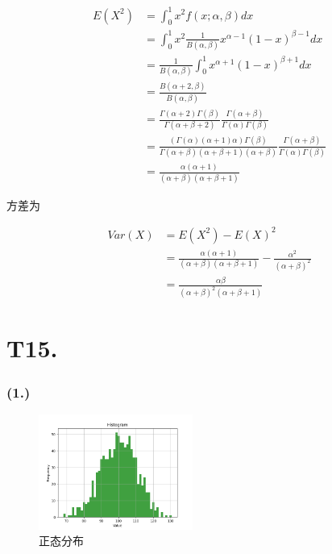 \documentclass{article}
\newcommand\f[2]{\frac{#1}{#2}}
\begin{document}
\begin{equation}
    \begin{aligned}
        E(X^2)
        & = \int_{0}^{1}x^2f(x;\alpha,\beta)dx\\
        & = \int_{0}^{1}x^2 \f{1}{B(\alpha,\beta)}x^{\alpha-1}(1-x)^{\beta-1}dx\\
        & = \f{1}{B(\alpha,\beta)}\int_{0}^{1}x^{\alpha+1}(1-x)^{\beta+1}dx\\
        & = \f{B(\alpha+2,\beta)}{B(\alpha,\beta)}\\
        & = \f{\Gamma(\alpha+2)\Gamma(\beta)}{\Gamma(\alpha+\beta+2)}\f{\Gamma(\alpha+\beta)}{\Gamma(\alpha)\Gamma(\beta)}\\
        & = \f{(\Gamma(\alpha)(\alpha+1)\alpha)\Gamma(\beta)}{\Gamma(\alpha+\beta)(\alpha+\beta+1)(\alpha+\beta)}\f{\Gamma(\alpha+\beta)}{\Gamma(\alpha)\Gamma(\beta)}\\
        & = \f{\alpha(\alpha+1)}{(\alpha+\beta)(\alpha+\beta+1)}
    \end{aligned}
\end{equation}

方差为

\begin{equation}
    \begin{aligned}
        Var(X)
        & = E(X^2)-E(X)^2\\
        & = \f{\alpha(\alpha+1)}{(\alpha+\beta)(\alpha+\beta+1)}-\f{\alpha^2}{(\alpha+\beta)^2}\\
        & = \f{\alpha\beta}{(\alpha+\beta)^2(\alpha+\beta+1)}
    \end{aligned}
\end{equation}

\section*{T15. }

\subsubsection*{(1.)}

\begin{center}
    \begin{figure}[H] %
        \centering %
        \includegraphics[width=0.45\textwidth]{img/Figure_1.png} %
        \caption{正态分布} %
        \label{fig1} %
    \end{figure}
\end{center}
\end{document}
